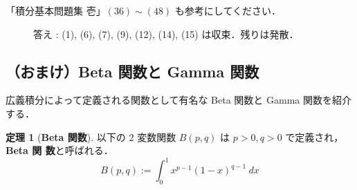 \documentclass[10pt, uplatex, dvipdfmx]{jsarticle}
\theoremstyle{definition}
\newtheorem{theorem}{定理}[section]
\numberwithin{equation}{section}
\begin{document}
\vspace{2zh}

「積分基本問題集 壱」$(36) \sim (48)$ も参考にしてください．

\begin{figure}[b]
  答え : (1), (6), (7), (9), (12), (14), (15) は収束．残りは発散．
\end{figure}

\newpage

\subsection{（おまけ）Beta 関数と Gamma 関数}

広義積分によって定義される関数として有名な Beta 関数と Gamma 関数を紹介
する．
\begin{theorem}[\textbf{Beta 関数}]
  以下の $2$ 変数関数 $B(p,q)$ は $p>0, q>0$ で定義され，\textbf{Beta 関
    数}と呼ばれる．
  \[
    B(p,q) := \int_{0}^{1} x^{p-1} (1-x)^{q-1} \ dx
  \]
\end{theorem}
\end{document}
